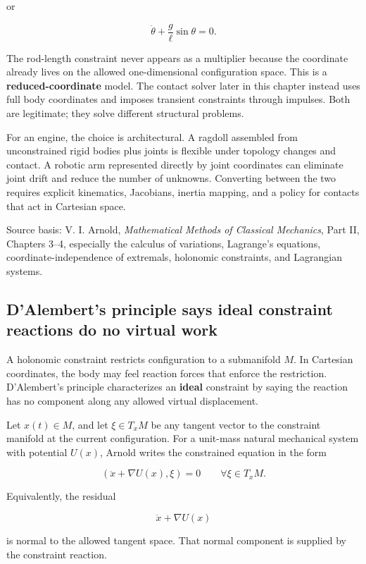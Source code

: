 or

\[
\ddot\theta+\frac{g}{\ell}\sin\theta=0.
\]

The rod-length constraint never appears as a multiplier because the coordinate already lives on the allowed one-dimensional configuration space. This is a \textbf{reduced-coordinate} model. The contact solver later in this chapter instead uses full body coordinates and imposes transient constraints through impulses. Both are legitimate; they solve different structural problems.

For an engine, the choice is architectural. A ragdoll assembled from unconstrained rigid bodies plus joints is flexible under topology changes and contact. A robotic arm represented directly by joint coordinates can eliminate joint drift and reduce the number of unknowns. Converting between the two requires explicit kinematics, Jacobians, inertia mapping, and a policy for contacts that act in Cartesian space.

Source basis: V. I. Arnold, \emph{Mathematical Methods of Classical Mechanics}, Part II, Chapters 3--4, especially the calculus of variations, Lagrange's equations, coordinate-independence of extremals, holonomic constraints, and Lagrangian systems.

\subsection{D'Alembert's principle says ideal constraint reactions do no virtual work}\label{dalemberts-principle-says-ideal-constraint-reactions-do-no-virtual-work}

A holonomic constraint restricts configuration to a submanifold \(M\). In Cartesian coordinates, the body may feel reaction forces that enforce the restriction. D'Alembert's principle characterizes an \textbf{ideal} constraint by saying the reaction has no component along any allowed virtual displacement.

Let \(x(t)\in M\), and let \(\xi\in T_xM\) be any tangent vector to the constraint manifold at the current configuration. For a unit-mass natural mechanical system with potential \(U(x)\), Arnold writes the constrained equation in the form

\[
\left(
\ddot x+\nabla U(x),
\xi
\right)
=
0
\qquad
\forall \xi\in T_xM.
\]

Equivalently, the residual

\[
\ddot x+\nabla U(x)
\]

is normal to the allowed tangent space. That normal component is supplied by the constraint reaction.


